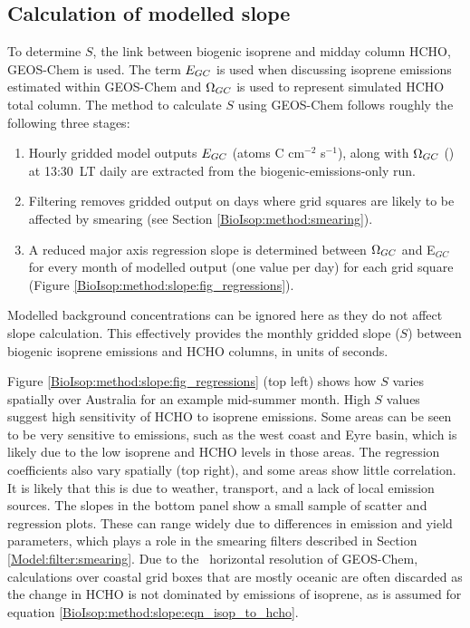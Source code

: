   \subsection{Calculation of modelled slope}
    \label{BioIsop:method:slope_calc}
    
    To determine $S$, the link between biogenic isoprene and midday column HCHO, GEOS-Chem is used.
    The term $E_{GC}$ is used when discussing isoprene emissions estimated within GEOS-Chem and $\Omega_{GC}$ is used to represent simulated HCHO total column.
    The method to calculate $S$ using GEOS-Chem follows roughly the following three stages: 
    \begin{enumerate}
      \item 
      Hourly gridded model outputs $E_{GC}$ (atoms C cm$^{-2}$ s$^{-1}$), along with $\Omega_{GC}$ (\moleccm) at 13:30~LT daily are extracted from the biogenic-emissions-only run.
      \item
      Filtering removes gridded output on days where grid squares are likely to be affected by smearing (see Section \ref{BioIsop:method:smearing}).
      \item 
      A reduced major axis regression slope is determined between $\Omega_{GC}$ and E$_{GC}$ for every month of modelled output (one value per day) for each grid square (Figure \ref{BioIsop:method:slope:fig_regressions}).
    \end{enumerate}
    Modelled background concentrations can be ignored here as they do not affect slope calculation.
    This effectively provides the monthly gridded slope ($S$) between biogenic isoprene emissions and HCHO columns, in units of seconds.
    
    
    Figure \ref{BioIsop:method:slope:fig_regressions} (top left) shows how $S$ varies spatially over Australia for an example mid-summer month.
    High $S$ values suggest high sensitivity of HCHO to isoprene emissions.
    Some areas can be seen to be very sensitive to emissions, such as the west coast and Eyre basin, which is likely due to the low isoprene and HCHO levels in those areas.
    The regression coefficients also vary spatially (top right), and some areas show little correlation.
    It is likely that this is due to weather, transport, and a lack of local emission sources.
    The slopes in the bottom panel show a small sample of scatter and regression plots. 
    These can range widely due to differences in emission and yield parameters, which plays a role in the smearing filters described in Section \ref{Model:filter:smearing}.
    Due to the \lowhr ~horizontal resolution of GEOS-Chem, calculations over coastal grid boxes that are mostly oceanic are often discarded as the change in HCHO is not dominated by emissions of isoprene, as is assumed for equation \ref{BioIsop:method:slope:eqn_isop_to_hcho}.
    
